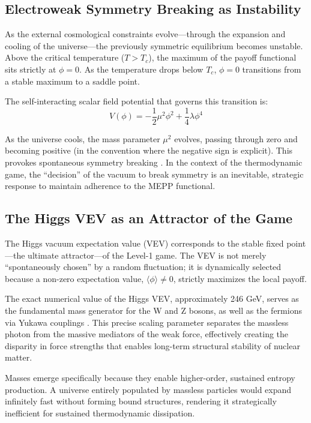 \documentclass[12pt,a4paper]{article}
\theoremstyle{remark}
\begin{document}
\subsection{Electroweak Symmetry Breaking as Instability}

As the external cosmological constraints evolve---through the expansion and cooling of the universe---the previously symmetric equilibrium becomes unstable. Above the critical temperature ($T > T_c$), the maximum of the payoff functional sits strictly at $\phi = 0$. As the temperature drops below $T_c$, $\phi = 0$ transitions from a stable maximum to a saddle point.

The self-interacting scalar field potential that governs this transition is:
\begin{equation}
V(\phi) = -\frac{1}{2}\mu^2 \phi^2 + \frac{1}{4}\lambda \phi^4
\end{equation}

As the universe cools, the mass parameter $\mu^2$ evolves, passing through zero and becoming positive (in the convention where the negative sign is explicit). This provokes spontaneous symmetry breaking \citep{HiggsVEV2024}. In the context of the thermodynamic game, the ``decision'' of the vacuum to break symmetry is an inevitable, strategic response to maintain adherence to the MEPP functional.

\subsection{The Higgs VEV as an Attractor of the Game}

The Higgs vacuum expectation value (VEV) corresponds to the stable fixed point---the ultimate attractor---of the Level-1 game. The VEV is not merely ``spontaneously chosen'' by a random fluctuation; it is dynamically selected because a non-zero expectation value, $\langle\phi\rangle \neq 0$, strictly maximizes the local payoff.

The exact numerical value of the Higgs VEV, approximately 246 GeV, serves as the fundamental mass generator for the W and Z bosons, as well as the fermions via Yukawa couplings \citep{HiggsVEV}. This precise scaling parameter separates the massless photon from the massive mediators of the weak force, effectively creating the disparity in force strengths that enables long-term structural stability of nuclear matter.

Masses emerge specifically because they enable higher-order, sustained entropy production. A universe entirely populated by massless particles would expand infinitely fast without forming bound structures, rendering it strategically inefficient for sustained thermodynamic dissipation.
\end{document}
